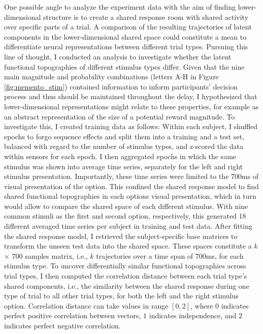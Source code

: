 One possible angle to analyze the experiment data with the aim of finding lower-dimensional structure is to create a shared response room with shared activity over specific parts of a trial.
A comparison of the resulting trajectories of latent components in the lower-dimensional shared space could constitute a mean to differentiate neural representations between different trial types.
Pursuing this line of thought, I conducted an analysis to investigate whether the latent functional topographies of different stimulus types differ.
Given that the nine main magnitude and probability combinations (letters A-H in Figure \ref{fig:memento_stim}) contained information to inform participants' decision process and thus should be maintained throughout the delay, I hypothesized that lower-dimensional representations might relate to these properties, for example as an abstract representation of the size of a potential reward magnitude.
To investigate this, I created training data as follows:
Within each subject, I shuffled epochs to forgo sequence effects and split them into a training and a test set, balanced with regard to the number of stimulus types, and z-scored the data within sensors for each epoch.
I then aggregated epochs in which the same stimulus was shown into average time series, separately for the left and right stimulus presentation.
Importantly, these time series were limited to the 700ms of visual presentation of the option.
This confined the shared response model to find shared functional topographies in each options visual presentation, which in turn would allow to compare the shared space of each different stimulus.
With nine common stimuli as the first and second option, respectively, this generated 18 different averaged time series per subject in training and test data.
After fitting the shared response model, I retrieved the subject-specific base matrices to transform the unseen test data into the shared space.
These spaces constitute a $k$ $\times$ 700 samples matrix, i.e., $k$ trajectories over a time span of 700ms, for each stimulus type.
To uncover differentially similar functional topographies across trial types, I then computed the correlation distance between each trial type's shared components, i.e., the similarity between the shared response during one type of trial to all other trial types, for both the left and the right stimulus option.
Correlation distance can take values in range $[0, 2]$, where $0$ indicates perfect positive correlation between vectors, $1$ indicates independence, and $2$ indicates perfect negative correlation.\\
